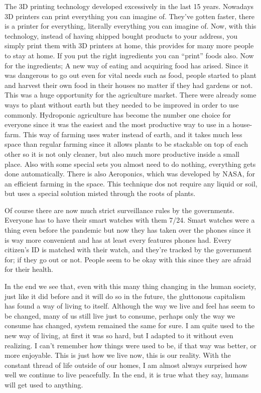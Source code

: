 \documentclass[]{book}
\begin{document}
The 3D printing technology developed excessively in the last 15 years. Nowadays 3D printers can print everything you can imagine of. They've gotten faster, there is a printer for everything, literally everything you can imagine of. Now, with this technology, instead of having shipped bought products to your address, you simply print them with 3D printers at home, this provides for many more people to stay at home. If you put the right ingredients you can ``print'' foods also. Now for the ingredients; A new way of eating and acquiring food has arised. Since it was dangerous to go out even for vital needs such as food, people started to plant and harvest their own food in their houses no matter if they had gardens or not. This was a huge opportunity for the agriculture market. There were already some ways to plant without earth but they needed to be improved in order to use commonly. Hydroponic agriculture has become the number one choice for everyone since it was the easiest and the most productive way to use in a house-farm. This way of farming uses water instead of earth, and it takes much less space than regular farming since it allows plants to be stackable on top of each other so it is not only cleaner, but also much more productive inside a small place. Also with some special sets you almost need to do nothing, everything gets done automatically. There is also Aeroponics, which was developed by NASA, for an efficient farming in the space. This technique dos not require any liquid or soil, but uses a special solution misted through the roots of plants.

Of course there are now much strict surveillance rules by the governments. Everyone has to have their smart watches with them 7/24. Smart watches were a thing even before the pandemic but now they has taken over the phones since it is way more convenient and has at least every features phones had. Every citizen's ID is matched with their watch, and they're tracked by the government for; if they go out or not. People seem to be okay with this since they are afraid for their health.

In the end we see that, even with this many thing changing in the human society, just like it did before and it will do so in the future, the gluttonous capitalism has found a way of living to itself. Although the way we live and feel has seem to be changed, many of us still live just to consume, perhaps only the way we consume has changed, system remained the same for sure. I am quite used to the new way of living, at first it was so hard, but I adapted to it without even realizing. I can't remember how things were used to be, if that way was better, or more enjoyable. This is just how we live now, this is our reality. With the constant thread of life outside of our homes, I am almost always surprised how well we continue to live peacefully. In the end, it is true what they say, humans will get used to anything.
\end{document}
